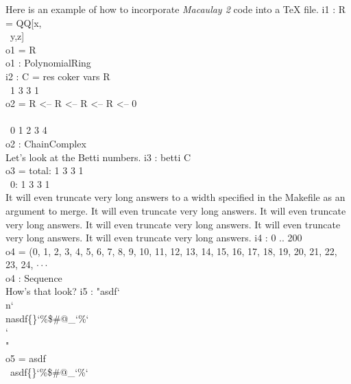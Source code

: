 \documentclass{minimal}
\def\M2{{\em Macaulay 2\/}}
\begin{document}
\noindent
Here is an example of how to incorporate \M2{} code into a TeX file.
\beginOutput
i1 : R = QQ[x,\\
\              y,z]\\
\emptyLine
o1 = R\\
\emptyLine
o1 : PolynomialRing\\
\endOutput
\beginOutput
i2 : C = res coker vars R\\
\emptyLine
\      1      3      3      1\\
o2 = R  <-- R  <-- R  <-- R  <-- 0\\
\                                  \\
\     0      1      2      3      4\\
\emptyLine
o2 : ChainComplex\\
\endOutput
Let's look at the Betti numbers.
\beginOutput
i3 : betti C\\
\emptyLine
o3 = total: 1 3 3 1\\
\         0: 1 3 3 1\\
\endOutput
It will even truncate very long answers to a width specified in the Makefile
as an argument to merge.
It will even truncate very long answers.
It will even truncate very long answers.
It will even truncate very long answers.
It will even truncate very long answers.
It will even truncate very long answers.
\beginOutput
i4 : 0 .. 200\\
\emptyLine
o4 = (0, 1, 2, 3, 4, 5, 6, 7, 8, 9, 10, 11, 12, 13, 14, 15, 16, 17, 18, 19, 20, 21, 22, 23, 24, $\cdot\cdot\cdot$\\
\emptyLine
o4 : Sequence\\
\endOutput
How's that look?
\beginOutput
i5 : "asdf{\char`\\}n{\char`\\}nasdf\{\}{\char`\%}\$#@_{\char`\%}{\char`\\}{\char`\\}"\\
\emptyLine
o5 = asdf\\
\emptyLine
\     asdf\{\}{\char`\%}\$#@_{\char`\%}{\char`\\}\\
\endOutput
\end{document}
